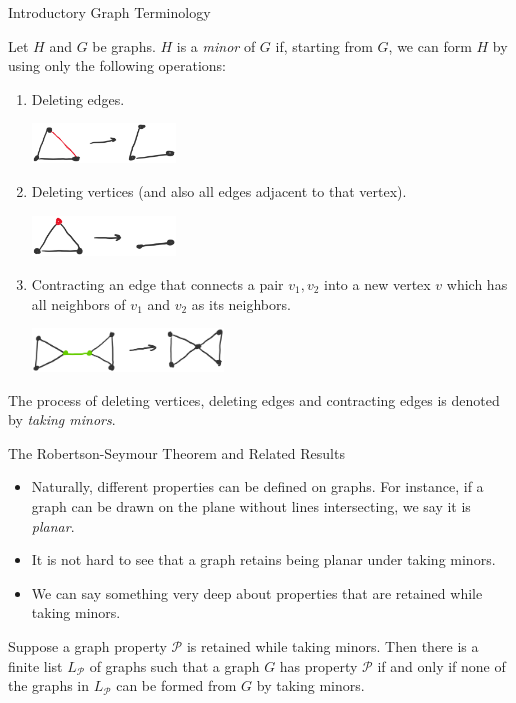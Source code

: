 \begin{frame}{Introductory Graph Terminology}
\begin{definition}
Let $H$ and $G$ be graphs. $H$ is a \emph{minor} of $G$ if, starting from $G$, we can form $H$ by using only the following operations:
\begin{enumerate}
\pause
    \item Deleting edges. 
    
    \includegraphics[width=0.3\textwidth]{deleteedge.png}
\pause
    \item Deleting vertices (and also all edges adjacent to that vertex).
    
    \includegraphics[width=0.3\textwidth]{deletevertex.png}
\pause
    \item Contracting an edge that connects a pair $v_1, v_2$ into a new vertex $v$ which has all neighbors of $v_1$ and $v_2$ as its neighbors.
    
    \includegraphics[width=0.4\textwidth]{contractedge.png}
    \pause
    \end{enumerate}
    
    The process of deleting vertices, deleting edges and contracting edges is denoted by \emph{taking minors}.
   
\end{definition}
\end{frame}

\begin{frame}{The Robertson-Seymour Theorem and Related Results}
\begin{itemize}
  \item {
  Naturally, different properties can be defined on graphs. For instance, if a graph can be drawn on the plane without lines intersecting, we say it is \emph{planar}. 
  } \pause
  \item {
  It is not hard to see that a graph retains being planar under taking minors. 
  } \pause
  \item { 
    We can say something very deep about properties that are retained while taking minors.
  }
  \end{itemize}
  \pause
  \begin{theorem}
  Suppose a graph property $\mathcal{P}$ is retained while taking minors. Then there is a finite list $L_\mathcal{P}$ of graphs such that a graph $G$ has property $\mathcal{P}$ if and only if none of the graphs in $L_\mathcal{P}$ can be formed from $G$ by taking minors. 
  \end{theorem}
\end{frame}

